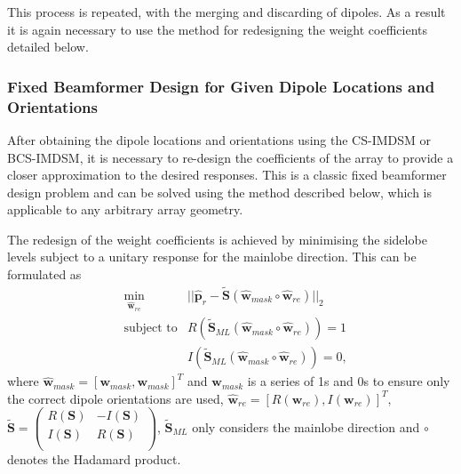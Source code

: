 \documentclass[10pt,final]{IEEEtran}
\begin{document}
This process is repeated, with the merging and discarding of dipoles.  As a result it is again necessary to use the method for redesigning the weight coefficients detailed below.

\subsubsection{Fixed Beamformer Design for Given Dipole Locations and Orientations}\label{subsub:redesign}
After obtaining the dipole locations and orientations using the CS-IMDSM or BCS-IMDSM, it is necessary to re-design the coefficients of the array to provide a closer approximation to the desired responses.  This is a classic fixed beamformer design problem and can be solved using the method described below, which is applicable to any arbitrary array geometry.

The redesign of the weight coefficients is achieved by minimising the sidelobe levels subject to a unitary response for the mainlobe direction. This can be formulated as
\begin{eqnarray}\nonumber \label{eq:redesign1}
  &\min\limits_{\hat{\textbf{w}}_{re}}& ||\hat{\textbf{p}}_{r}-\tilde{\textbf{S}}(\hat{\textbf{w}}_{mask}\circ\hat{\textbf{w}}_{re})||_{2}\\ \nonumber
  &\text{subject to}& R(\tilde{\textbf{S}}_{ML}(\hat{\textbf{w}}_{mask}\circ\hat{\textbf{w}}_{re}))=1\\
  &&I(\tilde{\textbf{S}}_{ML}(\hat{\textbf{w}}_{mask}\circ\hat{\textbf{w}}_{re}))=0,
\end{eqnarray}
where  $\hat{\textbf{w}}_{mask}=[\textbf{w}_{mask},\textbf{w}_{mask}]^{T}$ and $\textbf{w}_{mask}$ is a series of 1s and 0s to ensure only the correct dipole orientations are used, $\hat{\textbf{w}}_{re} = [R(\textbf{w}_{re}),I(\textbf{w}_{re})]^{T},$ $\tilde{\textbf{S}} = \left(
                            \begin{array}{cc}
                              R(\textbf{S}) & -I(\textbf{S}) \\
                              I(\textbf{S}) & R(\textbf{S}) \\
                            \end{array}
                          \right)$, $\tilde{\textbf{S}}_{ML}$ only considers the mainlobe direction and $\circ$ denotes the Hadamard product.
\end{document}
